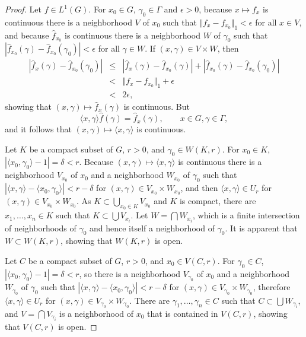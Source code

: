 \documentclass{article}
\newcommand{\inner}[2]{\langle #1, #2 \rangle}
\newcommand{\norm}[1]{\Vert #1 \Vert}
\begin{document}
\begin{proof}
Let $f \in L^1(G)$. 
For $x_0\in G$, $\gamma_0 \in \Gamma$ and $\epsilon>0$, because $x \mapsto f_x$ is  continuous there is a neighborhood
$V$ of $x_0$ such that $\norm{f_x-f_{x_0}}_1<\epsilon$ for all $x \in V$, and because $\hat{f}_{x_0}$ is continuous there is 
a neighborhood $W$ of $\gamma_0$ such that $|\hat{f}_{x_0}(\gamma)-\hat{f}_{x_0}(\gamma_0)|<\epsilon$ for all $\gamma \in W$. If
$(x,\gamma) \in V \times W$, then
\begin{eqnarray*}
|\hat{f}_x(\gamma)-\hat{f}_{x_0}(\gamma_0)|& \leq& |\hat{f}_x(\gamma)-\hat{f}_{x_0}(\gamma)| + |\hat{f}_{x_0}(\gamma)-\hat{f}_{x_0}(\gamma_0)|\\
&<&\norm{f_x-f_{x_0}}_1 + \epsilon\\
&<&2\epsilon,
\end{eqnarray*}
showing that $(x,\gamma) \mapsto \hat{f}_x(\gamma)$ is continuous. But
\[
\inner{x}{\gamma} \hat{f}(\gamma) = \hat{f}_x(\gamma), \qquad x \in G, \gamma \in \Gamma,
\]
and it follows that $(x,\gamma) \mapsto \inner{x}{\gamma}$ is continuous.

Let $K$ be a compact subset of $G$, $r>0$, and $\gamma_0 \in W(K,r)$. For $x_0 \in K$, 
$|\inner{x_0}{\gamma_0}-1|=\delta<r$. 
Because $(x,\gamma) \mapsto
\inner{x}{\gamma}$ is continuous there is a neighborhood $V_{x_0}$ of $x_0$ and a neighborhood $W_{x_0}$ of $\gamma_0$ such that
$|\inner{x}{\gamma}-\inner{x_0}{\gamma_0}|<r-\delta$ for $(x,\gamma) \in V_{x_0} \times W_{x_0}$, and then
$\inner{x}{\gamma} \in U_r$ for $(x,\gamma) \in V_{x_0} \times W_{x_0}$. As $K \subset \bigcup_{x_0 \in K} V_{x_0}$ and $K$ is compact, there are 
$x_1,\ldots,x_n \in K$ such that $K \subset \bigcup V_{x_i}$. Let $W = \bigcap W_{x_i}$, which is a finite intersection of neighborhoods of 
$\gamma_0$ and hence itself a neighborhood of $\gamma_0$. It is apparent that $W \subset W(K,r)$, showing
that $W(K,r)$ is open.

Let $C$ be a compact subset of $G$, $r>0$, and $x_0 \in V(C,r)$. For $\gamma_0 \in C$, $|\inner{x_0}{\gamma_0}-1|=\delta<r$,
so there is a neighborhood $V_{\gamma_0}$ of $x_0$ and a neighborhood $W_{\gamma_0}$ of
$\gamma_0$ such that $|\inner{x}{\gamma}-\inner{x_0}{\gamma_0}|<r-\delta$ for
$(x,\gamma) \in V_{\gamma_0} \times W_{\gamma_0}$, therefore $\inner{x}{\gamma} \in U_r$ for
$(x,\gamma) \in V_{\gamma_0} \times W_{\gamma_0}$. There are $\gamma_1,\ldots,\gamma_n \in C$ such that
$C \subset \bigcup W_{\gamma_i}$, and  $V = \bigcap V_{\gamma_i}$ is a neighborhood of $x_0$ that is contained in $V(C,r)$, showing that $V(C,r)$ is open.


\end{proof}
\end{document}
